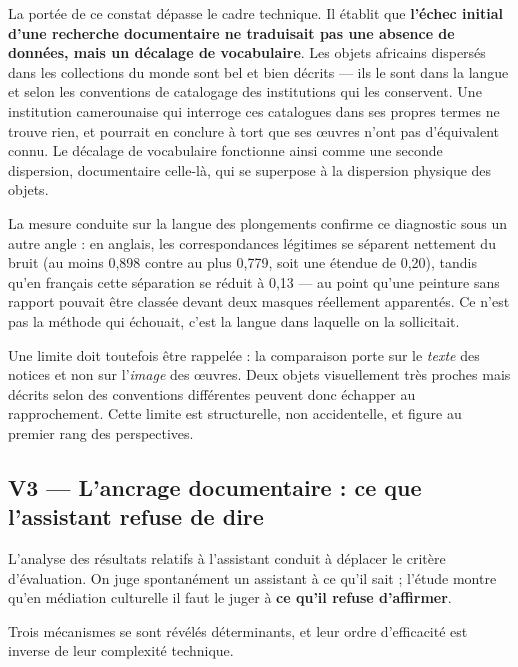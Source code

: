 La portée de ce constat dépasse le cadre technique. Il établit que
\textbf{l'échec initial d'une recherche documentaire ne traduisait pas une
absence de données, mais un décalage de vocabulaire}. Les objets africains
dispersés dans les collections du monde sont bel et bien décrits — ils le sont
dans la langue et selon les conventions de catalogage des institutions qui les
conservent. Une institution camerounaise qui interroge ces catalogues dans ses
propres termes ne trouve rien, et pourrait en conclure à tort que ses œuvres
n'ont pas d'équivalent connu. Le décalage de vocabulaire fonctionne ainsi comme
une seconde dispersion, documentaire celle-là, qui se superpose à la dispersion
physique des objets.

La mesure conduite sur la langue des plongements confirme ce diagnostic sous un
autre angle : en anglais, les correspondances légitimes se séparent nettement du
bruit (au moins 0,898 contre au plus 0,779, soit une étendue de 0,20), tandis
qu'en français cette séparation se réduit à 0,13 — au point qu'une peinture sans
rapport pouvait être classée devant deux masques réellement apparentés. Ce n'est
pas la méthode qui échouait, c'est la langue dans laquelle on la sollicitait.

Une limite doit toutefois être rappelée : la comparaison porte sur le
\emph{texte} des notices et non sur l'\emph{image} des œuvres. Deux objets
visuellement très proches mais décrits selon des conventions différentes peuvent
donc échapper au rapprochement. Cette limite est structurelle, non accidentelle,
et figure au premier rang des perspectives.

\subsection{V3 — L'ancrage documentaire : ce que l'assistant refuse de dire}

L'analyse des résultats relatifs à l'assistant conduit à déplacer le critère
d'évaluation. On juge spontanément un assistant à ce qu'il sait ; l'étude montre
qu'en médiation culturelle il faut le juger à \textbf{ce qu'il refuse
d'affirmer}.

Trois mécanismes se sont révélés déterminants, et leur ordre d'efficacité est
inverse de leur complexité technique.

